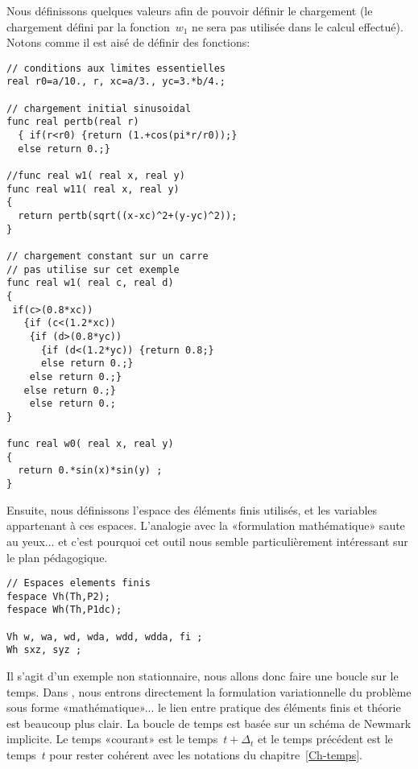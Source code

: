 \medskip
Nous définissons quelques valeurs afin de pouvoir définir le chargement (le chargement défini par la fonction~$w_1$ ne sera pas utilisée dans le calcul effectué). Notons comme il est aisé de définir des fonctions:
\begin{multicols}{2}
\begin{lstlisting}[firstnumber=last]
// conditions aux limites essentielles 
real r0=a/10., r, xc=a/3., yc=3.*b/4.; 

// chargement initial sinusoidal
func real pertb(real r)
  { if(r<r0) {return (1.+cos(pi*r/r0));}
  else return 0.;}

//func real w1( real x, real y)
func real w11( real x, real y)
{
  return pertb(sqrt((x-xc)^2+(y-yc)^2)); 
}

// chargement constant sur un carre
// pas utilise sur cet exemple
func real w1( real c, real d)
{
 if(c>(0.8*xc))
   {if (c<(1.2*xc)) 
    {if (d>(0.8*yc))
      {if (d<(1.2*yc)) {return 0.8;}
      else return 0.;}
    else return 0.;}
   else return 0.;}
	else return 0.;
}

func real w0( real x, real y)
{
  return 0.*sin(x)*sin(y) ; 
}
\end{lstlisting}
\end{multicols}

Ensuite, nous définissons l'espace des éléments finis utilisés, et les variables appartenant à ces espaces. L'analogie avec la «formulation mathématique» saute au yeux... et c'est pourquoi cet outil nous semble particulièrement intéressant sur le plan pédagogique.
\begin{lstlisting}[firstnumber=last]
// Espaces elements finis 
fespace Vh(Th,P2); 
fespace Wh(Th,P1dc);

Vh w, wa, wd, wda, wdd, wdda, fi ; 
Wh sxz, syz ; 
\end{lstlisting}

Il s'agit d'un exemple non stationnaire, nous allons donc faire une boucle sur le temps. Dans \freefem, nous entrons directement la formulation variationnelle du problème sous forme «mathématique»... le lien entre pratique des éléments finis et théorie est beaucoup plus clair. La boucle de temps est basée sur un schéma de Newmark implicite. Le temps «courant» est le temps~$t+\Delta_t$ et le temps précédent est le temps~$t$ pour rester cohérent avec les notations du chapitre~\ref{Ch-temps}.

